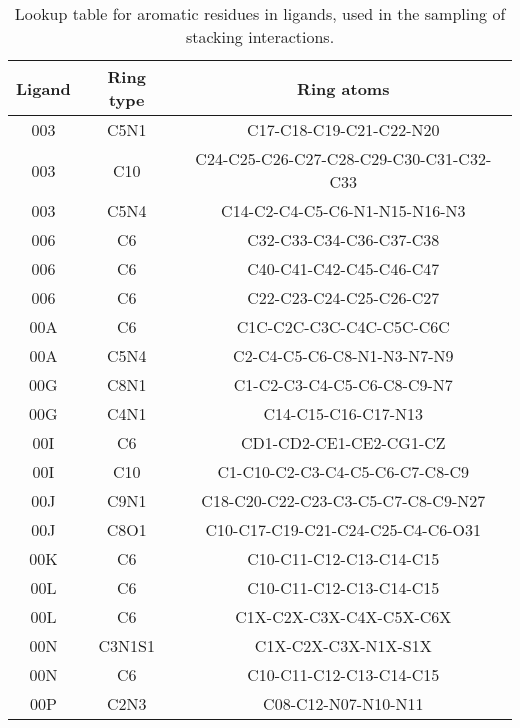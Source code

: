 \begin{table}[H]
  \caption{\label{tab:appx1/aromatic_ligand} Lookup table for aromatic residues in ligands, used in the sampling of stacking interactions.}
  \centering
  \begin{tabular}{ccc}
    \hline
    Ligand  & Ring type  & Ring atoms                              \\ \hline
    003     & C5N1       & C17-C18-C19-C21-C22-N20                 \\
    003     & C10        & C24-C25-C26-C27-C28-C29-C30-C31-C32-C33 \\
    003     & C5N4       & C14-C2-C4-C5-C6-N1-N15-N16-N3           \\
    006     & C6         & C32-C33-C34-C36-C37-C38                 \\
    006     & C6         & C40-C41-C42-C45-C46-C47                 \\
    006     & C6         & C22-C23-C24-C25-C26-C27                 \\
    00A     & C6         & C1C-C2C-C3C-C4C-C5C-C6C                 \\
    00A     & C5N4       & C2-C4-C5-C6-C8-N1-N3-N7-N9              \\
    00G     & C8N1       & C1-C2-C3-C4-C5-C6-C8-C9-N7              \\
    00G     & C4N1       & C14-C15-C16-C17-N13                     \\
    00I     & C6         & CD1-CD2-CE1-CE2-CG1-CZ                  \\
    00I     & C10        & C1-C10-C2-C3-C4-C5-C6-C7-C8-C9          \\
    00J     & C9N1       & C18-C20-C22-C23-C3-C5-C7-C8-C9-N27      \\
    00J     & C8O1       & C10-C17-C19-C21-C24-C25-C4-C6-O31       \\
    00K     & C6         & C10-C11-C12-C13-C14-C15                 \\
    00L     & C6         & C10-C11-C12-C13-C14-C15                 \\
    00L     & C6         & C1X-C2X-C3X-C4X-C5X-C6X                 \\
    00N     & C3N1S1     & C1X-C2X-C3X-N1X-S1X                     \\
    00N     & C6         & C10-C11-C12-C13-C14-C15                 \\
    00P     & C2N3       & C08-C12-N07-N10-N11                     \\ \hline
  \end{tabular}
\end{table}


